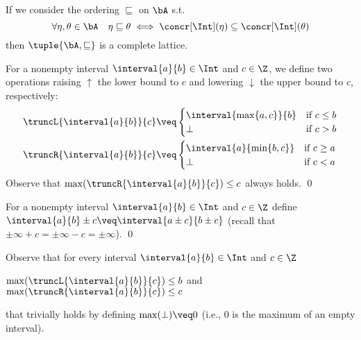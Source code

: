 \begin{observation}
  If we consider the ordering \(\sqsubseteq\) on \(\bA\)
  s.t. \[\forall \eta, \theta \in \bA \quad \eta \sqsubseteq \theta
  \iff \concr[\Int](\eta) \subseteq \concr[\Int](\theta)\] then
  \(\tuple{\bA, \sqsubseteq}\) is a complete lattice.
\end{observation}

\begin{definition}
  \label{de:trunc}
  For a nonempty interval \(\interval{a}{b} \in \Int\) and \(c \in \Z\), we define
  two operations raising \(\uparrow\) the lower bound to \(c\) and lowering \(\downarrow\) the upper
  bound to \(c\), respectively:
  \begin{align*}
    &\truncL{\interval{a}{b}}{c} \veq 
    \begin{cases} 
      \interval{\max\{a,c\}}{b} & \text{if } c\leq b\\
      \bot & \text{if } c > b
    \end{cases}
    \\
    &\truncR{\interval{a}{b}}{c} \veq 
    \begin{cases}   
      \interval{a}{\min\{b,c\}} & \text{if } c\geq a\\
      \bot & \text{if } c < a 
    \end{cases} 
  \end{align*}
  Observe that \(\max(\truncR{\interval{a}{b}}{c})\leq c\) always holds. \qed   
\end{definition}

\begin{definition}
  \label{de:add}
  For a nonempty interval \(\interval{a}{b} \in \Int\) and \(c \in \Z\) define
  \(\interval{a}{b} \pm c \veq \interval{a\pm c}{b\pm c}\) (recall that \(\pm \infty + c = \pm\infty - c = \pm\infty\)).  
  \qed
\end{definition}


Observe that for every interval \(\interval{a}{b} \in \Int\) and
\(c \in \Z\)
\begin{center}
  \(\max(\truncL{\interval{a}{b}}{c}) \leq b\)
  \qquad and \qquad
  \(\max(\truncR{\interval{a}{b}}{c}) \leq c\)
\end{center}
that trivially holds by 
defining \(\max (\bot)  \veq 0\) (i.e., \(0\) is the maximum of
an empty interval).




